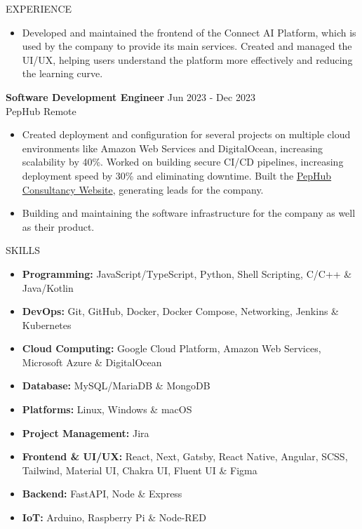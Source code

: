 \documentclass{resume}
\begin{document}
\begin{rSection}{EXPERIENCE}
\begin{itemize}
    \item{Developed and maintained the frontend of the Connect AI Platform, which is used by the company to provide its main services. Created and managed the UI/UX, helping users understand the platform more effectively and reducing the learning curve.}
  \end{itemize}
  \vspace{-0.4em}
  {\bf Software Development Engineer} \hfill {Jun 2023 - Dec 2023}\\
  PepHub \hfill {Remote}
  \vspace{-0.4em}
  \begin{itemize}
    \item{Created deployment and configuration for several projects on multiple cloud environments like Amazon Web Services and DigitalOcean, increasing scalability by 40\%. Worked on building secure CI/CD pipelines, increasing deployment speed by 30\% and eliminating downtime. Built the {\href{https://consultancy.pephub.tech}{PepHub Consultancy Website}}, generating leads for the company.}
  \end{itemize}
  \vspace{-0.4em}
  \begin{itemize}
    \item{Building and maintaining the software infrastructure for the company as well as their product.}
  \end{itemize}
\end{rSection}
\vspace{-0.4em}
\begin{rSection}{SKILLS}
  \begin{itemize}
    \item \textbf{Programming:} JavaScript/TypeScript, Python, Shell Scripting, C/C++ \& Java/Kotlin
    \item \textbf{DevOps:} Git, GitHub, Docker, Docker Compose, Networking, Jenkins \& Kubernetes
    \item \textbf{Cloud Computing:} Google Cloud Platform, Amazon Web Services, Microsoft Azure \& DigitalOcean
    \item \textbf{Database:} MySQL/MariaDB \& MongoDB
    \item \textbf{Platforms:} Linux, Windows \& macOS
    \item \textbf{Project Management:} Jira
    \item \textbf{Frontend \& UI/UX:} React, Next, Gatsby, React Native, Angular, SCSS, Tailwind, Material UI, Chakra UI, Fluent UI \& Figma
    \item \textbf{Backend:} FastAPI, Node \& Express
    \item \textbf{IoT:} Arduino, Raspberry Pi \& Node-RED
  \end{itemize}
\end{rSection}
\end{document}
